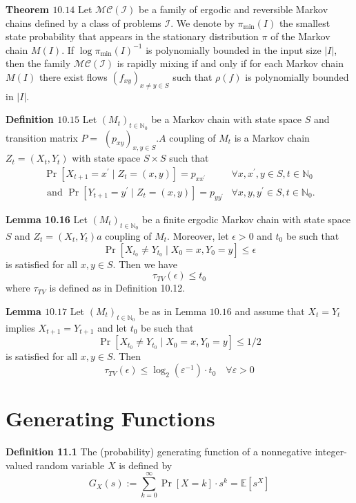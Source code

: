 \textbf{Theorem $10.14$}
 Let $\mathcal{M C}(\mathcal{I})$ be a family of ergodic and reversible Markov chains defined by a class of problems $\mathcal{I} .$ We denote by $\pi_{\min }(I)$ the smallest state probability that appears in the stationary distribution $\pi$ of the Markov chain $M(I) .$ If $\log \pi_{\min }(I)^{-1}$ is polynomially bounded in the input size $|I|$, then the family $\mathcal{M C}(\mathcal{I})$ is rapidly mixing if and only if for each Markov chain $M(I)$ there exist flows $\left(f_{x y}\right)_{x \neq y \in S}$ such that $\rho(f)$ is polynomially bounded in $|I|$.
 
\textbf{ Definition $10.15$} Let $\left(M_{t}\right)_{t \in \mathbb{N}_{0}}$ be a Markov chain with state space $S$ and transition matrix $P=$ $\left(p_{x y}\right)_{x, y \in S} . A$ coupling of $M_{t}$ is a Markov chain $Z_{t}=\left(X_{t}, Y_{t}\right)$ with state space $S \times S$ such that
$$
\begin{array}{lll}
\operatorname{Pr}\left[X_{t+1}=x^{\prime} \mid Z_{t}=(x, y)\right]=p_{x x^{\prime}} & \forall x, x^{\prime}, y \in S, t \in \mathbb{N}_{0} \\
\text { and } \operatorname{Pr}\left[Y_{t+1}=y^{\prime} \mid Z_{t}=(x, y)\right]=p_{y y^{\prime}} & \forall x, y, y^{\prime} \in S, t \in \mathbb{N}_{0} .
\end{array}
$$

\textbf{Lemma 10.16} Let $\left(M_{t}\right)_{t \in \mathbb{N}_{0}}$ be a finite ergodic Markov chain with state space $S$ and $Z_{t}=\left(X_{t}, Y_{t}\right) a$ coupling of $M_{t}$. Moreover, let $\epsilon>0$ and $t_{0}$ be such that
$$
\operatorname{Pr}\left[X_{t_{0}} \neq Y_{t_{0}} \mid X_{0}=x, Y_{0}=y\right] \leq \epsilon
$$
is satisfied for all $x, y \in S$. Then we have
$$
\tau_{T V}(\epsilon) \leq t_{0}
$$
where $\tau_{T V}$ is defined as in Definition 10.12.

\textbf{Lemma $10.17$} Let $\left(M_{t}\right)_{t \in \mathbb{N}_{0}}$ be as in Lemma $10.16$ and assume that $X_{t}=Y_{t}$ implies $X_{t+1}=Y_{t+1}$ and let $t_{0}$ be such that
$$
\operatorname{Pr}\left[X_{t_{0}} \neq Y_{t_{0}} \mid X_{0}=x, Y_{0}=y\right] \leq 1 / 2
$$
is satisfied for all $x, y \in S$. Then
$$
\tau_{T V}(\epsilon) \leq \log _{2}\left(\varepsilon^{-1}\right) \cdot t_{0} \quad \forall \varepsilon>0
$$

\section{Generating Functions}
\textbf{Definition 11.1} The (probability) generating function of a nonnegative integer-valued random variable $X$ is defined by
$$
G_{X}(s):=\sum_{k=0}^{\infty} \operatorname{Pr}[X=k] \cdot s^{k}=\mathbb{E}\left[s^{X}\right]
$$

